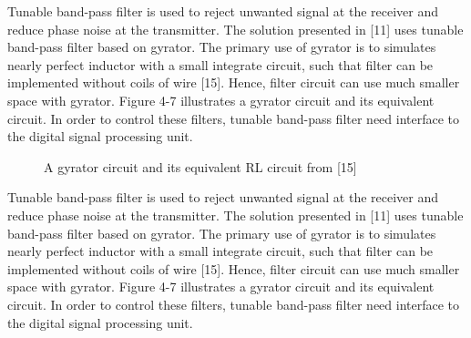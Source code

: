 \documentclass[conference]{IEEEtran}
\begin{document}
Tunable band-pass filter is used to reject unwanted signal at the receiver and reduce phase noise at the transmitter. The solution presented in [11] uses tunable band-pass filter based on gyrator. The primary use of gyrator is to simulates nearly perfect inductor with a small integrate circuit, such that filter can be implemented without coils of wire [15].  Hence, filter circuit can use much smaller space with gyrator. Figure 4-7 illustrates a gyrator circuit and its equivalent circuit. In order to control these filters, tunable band-pass filter need interface to the digital signal processing unit. 

\begin{figure}[h!]
	\centering
	\caption{A gyrator circuit and its equivalent RL circuit from [15]}
\end{figure}

Tunable band-pass filter is used to reject unwanted signal at the receiver and reduce phase noise at the transmitter. The solution presented in [11] uses tunable band-pass filter based on gyrator. The primary use of gyrator is to simulates nearly perfect inductor with a small integrate circuit, such that filter can be implemented without coils of wire [15].  Hence, filter circuit can use much smaller space with gyrator. Figure 4-7 illustrates a gyrator circuit and its equivalent circuit. In order to control these filters, tunable band-pass filter need interface to the digital signal processing unit. 


%
%
\end{document}
